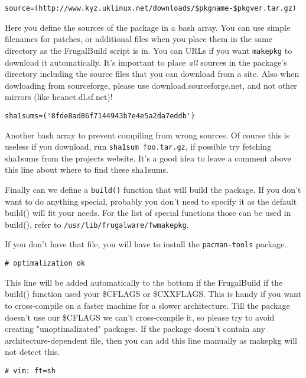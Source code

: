 \begin{verbatim}
source=(http://www.kyz.uklinux.net/downloads/$pkgname-$pkgver.tar.gz)
\end{verbatim}

Here you define the sources of the package in a bash array. You can use simple filenames for patches, or additional files when you place them in the same directory as the FrugalBuild script is in. You can URLs if you want {\tt makepkg} to download it automatically. It's important to place \textit{all} sources in the package's directory including the source files that you can download from a site.
Also when dowloading from sourceforge, please use download.sourceforge.net, and
not other mirrors (like heanet.dl.sf.net)!

\begin{verbatim}
sha1sums=('8fde8ad86f7144943b7e4e5a2da7eddb')
\end{verbatim}

Another bash array to prevent compiling from wrong sources. Of course this is
useless if you download, run {\tt sha1sum foo.tar.gz}, if possible try fetching
sha1sums from the projects website. It's a good idea to leave a comment above
this line about where to find these sha1sums.

Finally can we define a {\tt build()} function that will build the package.
If you don't want to do anything special, probably you don't need to specify it
as the default build() will fit your needs. For the list of special functions
those can be used in build(), refer to {\tt /usr/lib/frugalware/fwmakepkg}.

If you don't have that file, you will have to install the {\tt pacman-tools}
package.

\begin{verbatim}
# optimalization ok
\end{verbatim}

This line will be added automatically to the bottom if the FrugalBuild if the
build() function used your \$CFLAGS or \$CXXFLAGS. This is handy if you want to
cross-compile on a faster machine for a slower architecture. Till the package
doesn't use our \$CFLAGS we can't cross-compile it, so please try to avoid
creating "unoptimalizated" packages. If the package doesn't contain any
architecture-dependent file, then you can add this line manually as makepkg
will not detect this.

\begin{verbatim}
# vim: ft=sh
\end{verbatim}


